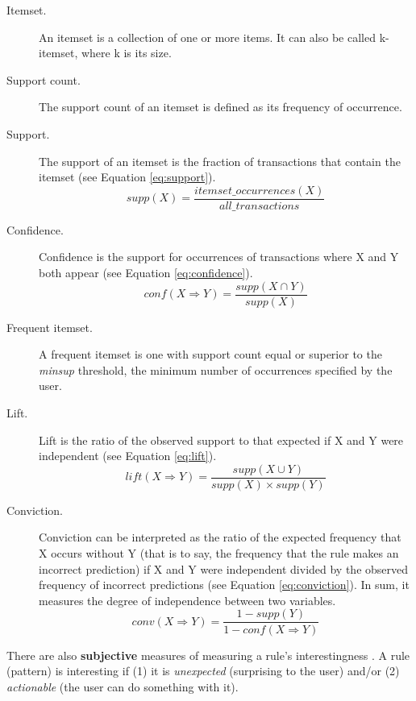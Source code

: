 \begin{description}
	\item[Itemset.] An itemset is a collection of one or more items. It can also be called k-itemset, where k is its size.
	\item[Support count.] The support count of an itemset is defined as its frequency of occurrence. 
	\item[Support.] The support of an itemset is the fraction of transactions that contain the itemset (see Equation \ref{eq:support}). 
		\begin{equation}\label{eq:support}
			supp(X) =\frac{itemset\_occurrences(X)}{all\_transactions}
		\end{equation}
	\item[Confidence.] Confidence is the support for occurrences of transactions where X and Y both appear (see Equation \ref{eq:confidence}). 
		\begin{equation}\label{eq:confidence}
			conf(X \Rightarrow Y) =\frac{supp(X \cap Y)}{supp(X)}
		\end{equation}
	\item[Frequent itemset.] A frequent itemset is one with support count equal or superior to the \textit{minsup} threshold, the minimum number of occurrences specified by the user.
	\item[Lift.] Lift is the ratio of the observed support to that expected if X and Y were independent (see Equation \ref{eq:lift}). 
		\begin{equation} \label{eq:lift}
			lift(X \Rightarrow Y)=\frac{supp(X \cup Y)}{supp(X) \times supp(Y)}
		\end{equation}
	\item[Conviction.] Conviction  can be interpreted as the ratio of the expected frequency that X occurs without Y (that is to say, the frequency that the rule makes an incorrect prediction) if X and Y were independent divided by the observed frequency of incorrect predictions (see Equation \ref{eq:conviction}). In sum, it measures the degree of independence between two variables.
		\begin{equation} \label{eq:conviction}
			 conv(X \Rightarrow Y)=\frac{1-supp(Y)}{1-conf(X\Rightarrow Y)}
		\end{equation}
\end{description}

There are also \textbf{subjective} measures of measuring a rule's interestingness \cite{silberschatz1995subjective}. A rule (pattern) is interesting if (1) it is \textit{unexpected} (surprising to the user) and/or (2) \textit{actionable} (the user can do something with it).

